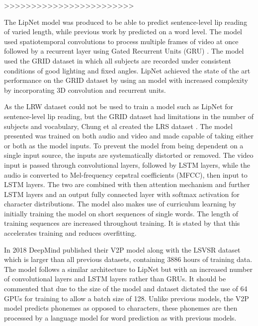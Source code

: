 \documentclass[12pt]{report}
\begin{document}
>>>>>>>>>>>>>>>>>>>>>>>>

The LipNet model \cite{Assael2016} was produced to be able to predict sentence-level lip reading of varied length, while previous work by \cite{Chung2016} predicted on a word level.
The model used spatiotemporal convolutions to process multiple frames of video at once followed by a recurrent layer using Gated Recurrent Units (GRU) \cite{Cho2014}.
The model used the GRID dataset \cite{Cooke2006} in which all subjects are recorded under consistent conditions of good lighting and fixed angles.
LipNet achieved the state of the art performance on the GRID dataset by using an model with increased complexity by incorporating 3D convolution and recurrent units.

As the LRW dataset could not be used to train a model such as LipNet for sentence-level lip reading, but the GRID dataset had limitations in the number of subjects and vocabulary, Chung et al created the LRS dataset \cite{Chung2017}.
The model presented was trained on both audio and video and made capable of taking either or both as the model inputs.
To prevent the model from being dependent on a single input source, the inputs are systematically distorted or removed.
The video input is passed through convolutional layers, followed by LSTM layers, while the audio is converted to Mel-frequency cepstral coefficients (MFCC), then input to LSTM layers.
The two are combined with then attention mechanism and further LSTM layers and an output fully connected layer with softmax activation for character distributions.
The model also makes use of curriculum learning by initially training the model on short sequences of single words.
The length of training sequences are increased throughout training.
It is stated by \cite{Chung2017} that this accelerates training and reduces overfitting.

In 2018 DeepMind published their V2P model \cite{Shillingford2018} along with the LSVSR dataset which is larger than all previous datasets, containing 3886 hours of training data.
The model follows a similar architecture to LipNet \cite{Assael2016} but with an increased number of convolutional layers and LSTM layers rather than GRUs.
It should be commented that due to the size of the model and dataset dictated the use of 64 GPUs for training to allow a batch size of 128.
Unlike previous models, the V2P model predicts phonemes as opposed to characters, these phonemes are then processed by a language model for word prediction as with previous models.
\end{document}
